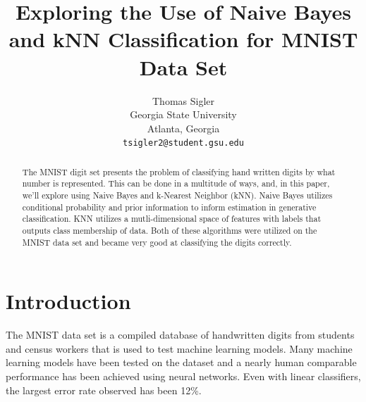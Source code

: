 \documentclass[10pt,twocolumn,letterpaper]{article}
\begin{document}
\title{Exploring the Use of Naive Bayes and kNN Classification for MNIST Data Set}

\author{Thomas Sigler\\
Georgia State University\\
Atlanta, Georgia\\
{\tt\small tsigler2@student.gsu.edu}
}
\maketitle

\begin{abstract}
   The MNIST digit set presents the problem of classifying hand written digits by what number is represented. This can be done in a multitude of ways, and, in this paper, we'll explore using Naive Bayes and k-Nearest Neighbor (kNN). Naive Bayes utilizes conditional probability and prior information to inform estimation in generative classification. KNN utilizes a mutli-dimensional space of features with labels that outputs class membership of data. Both of these algorithms were utilized on the MNIST data set and became very good at classifying the digits correctly.
\end{abstract}

\section{Introduction}
\label{sec:intro}

The MNIST data set is a compiled database of handwritten digits from students and census workers that is used to test machine learning models. Many machine learning models have been tested on the dataset and a nearly human comparable performance has been achieved using neural networks. Even with linear classifiers, the largest error rate observed has been 12\%. \cite{Alpher04}




\end{document}
